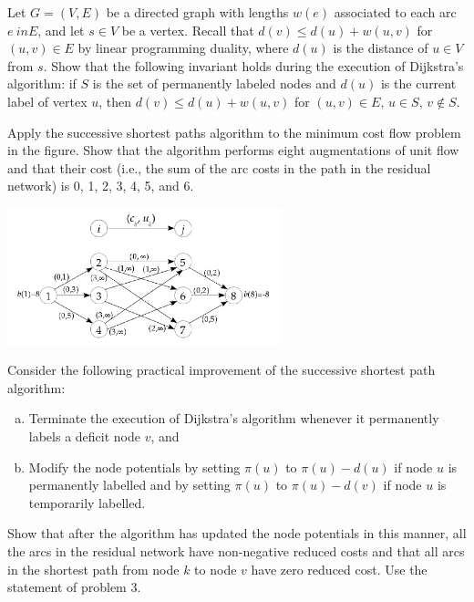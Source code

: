 \documentclass[fleqn]{homework}
\begin{document}
  \begin{problem}{3}
    \begin{question}
      Let $G=(V, E)$ be a directed graph with lengths $w(e)$ associated to each
      arc $e\ in E$, and let $s \in V$ be a vertex. Recall that
      $d(v) \le d(u) + w(u,v)$ for $(u,v) \in E$ by linear programming duality,
      where $d(u)$ is the distance of $u \in V$ from $s$. Show that the
      following invariant holds during the execution of Dijkstra’s algorithm: if
      $S$ is the set of permanently labeled nodes and $d(u)$ is the current
      label of vertex $u$, then $d(v) \le d(u) + w(u,v)$ for $(u,v) \in E$,
      $u \in S$, $v \not\in S$.
    \end{question}
  \end{problem}

  \begin{problem}{5}
    \begin{question}
      Apply the successive shortest paths algorithm to the minimum cost flow
      problem in the figure. Show that the algorithm performs eight
      augmentations of unit flow and that their cost (i.e., the sum of the arc
      costs in the path in the residual network) is 0, 1, 2, 3, 4, 5, and 6.

      \includegraphics[width=0.6\textwidth]{p5-fig.png}
    \end{question}
  \end{problem}

  \begin{problem}{7}
    \begin{question}
      Consider the following practical improvement of the successive shortest
      path algorithm:

      \begin{enumerate}[a.]
      \item Terminate the execution of Dijkstra's algorithm whenever it
        permanently labels a deficit node $v$, and

      \item Modify the node potentials by setting $\pi(u)$ to $\pi(u)-d(u)$ if
        node $u$ is permanently labelled and by setting $\pi(u)$ to
        $\pi(u)-d(v)$ if node $u$ is temporarily labelled.
      \end{enumerate}

      Show that after the algorithm has updated the node potentials in this
      manner, all the arcs in the residual network have non-negative reduced
      costs and that all arcs in the shortest path from node $k$ to node $v$
      have zero reduced cost. Use the statement of problem 3.
    \end{question}
  \end{problem}
\end{document}
